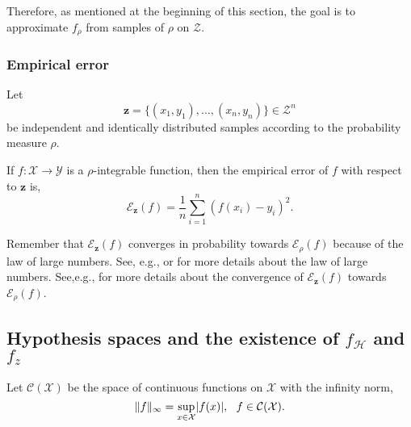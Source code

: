 Therefore, as mentioned at the beginning of this section, the goal is to approximate $f_{\rho}$ from samples of $\rho$ on $\mathcal{Z}$.

\subsubsection{Empirical error}

Let
\begin{equation*}
  \pmb{z} = \{(x_1,y_1),\dots,(x_n,y_n)\} \in \mathcal{Z}^n
\end{equation*}
be independent and identically distributed samples according to the probability measure $\rho$.

\begin{definition}  \label{def_empiricalError}
If $f: \mathcal{X} \to \mathcal{Y}$ is a $\rho$-integrable function, then the empirical error of $f$ with respect to $\pmb{z}$ is,
\begin{equation*}
  \mathcal{E}_{\pmb{z}}(f) = \frac{1}{n} \sum_{i=1}^{n} (f(x_i)-y_i)^2.
\end{equation*}
\end{definition}

Remember that $\mathcal{E}_{\pmb{z}}(f)$ converges in probability towards $\mathcal{E}_{\rho}(f)$ because of the law of large numbers. See, e.g., \textcite{dekking2005} or \textcite{yao2016} for more details about the law of large numbers. See,e.g., \textcite{cucker2001} for more details about the convergence of $\mathcal{E}_{\pmb{z}}(f)$ towards $\mathcal{E}_{\rho}(f)$.

\subsection{Hypothesis spaces and the existence of $f_{\mathcal{H}}$ and $f_z$} \label{sec_hypothesisSpaces}

\begin{definition} \label{def_continuosFunctBanachSpace}
  Let $\mathcal{C}(\mathcal{X})$ be the space of continuous functions on $\mathcal{X}$ with the infinity norm,
  \begin{equation} \label{eq_inifinitynorm}
    \|f\|_{\infty} = \underset{x \in \mathcal{X}}{\textup{sup}} |f(x)|, \ \ f \in \mathcal{C}(\mathcal{X}).
  \end{equation}
\end{definition}

